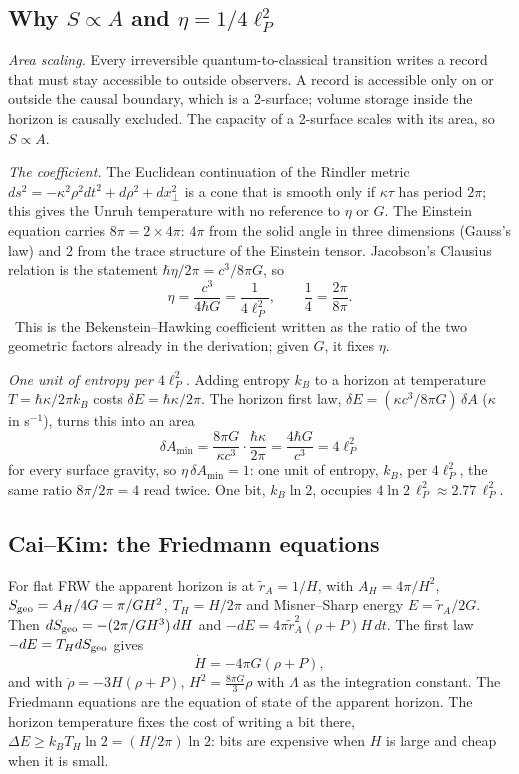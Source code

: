 \subsection{Why $S\propto A$ and $\eta=1/4\ell_P^2$}
\emph{Area scaling.} Every irreversible quantum-to-classical transition writes a record that must stay accessible to outside observers. A record is
accessible only on or outside the causal boundary, which is a 2-surface; volume storage inside the horizon is causally excluded. The capacity of a
2-surface scales with its area, so $S\propto A$.

\emph{The coefficient.} The Euclidean continuation of the Rindler metric $ds^2=-\kappa^2\rho^2dt^2+d\rho^2+dx_\perp^2$ is a cone that is smooth only if
$\kappa\tau$ has period $2\pi$; this gives the Unruh temperature with no reference to $\eta$ or $G$. The Einstein equation carries
$8\pi=2\times4\pi$: $4\pi$ from the solid angle in three dimensions (Gauss's law) and $2$ from the trace structure of the Einstein tensor. Jacobson's
Clausius relation is the statement $\hbar\eta/2\pi=c^3/8\pi G$, so
\begin{equation}\eta=\frac{c^3}{4\hbar G}=\frac{1}{4\ell_P^2},\qquad\frac14=\frac{2\pi}{8\pi}.\end{equation}
\calc\ This is the Bekenstein--Hawking coefficient written as the ratio of the two geometric factors already in the derivation; given $G$, it fixes $\eta$.

\emph{One unit of entropy per $4\ell_P^2$.} Adding entropy $k_B$ to a horizon at temperature $T=\hbar\kappa/2\pi k_B$ costs $\delta E=\hbar\kappa/2\pi$.
The horizon first law, $\delta E=(\kappa c^3/8\pi G)\,\delta A$ ($\kappa$ in s$^{-1}$), turns this into an area
\begin{equation}\delta A_{\min}=\frac{8\pi G}{\kappa c^3}\cdot\frac{\hbar\kappa}{2\pi}=\frac{4\hbar G}{c^3}=4\ell_P^2\end{equation}
for every surface gravity, so $\eta\,\delta A_{\min}=1$: one unit of entropy, $k_B$, per $4\ell_P^2$, the same ratio $8\pi/2\pi=4$ read twice. One bit,
$k_B\ln2$, occupies $4\ln2\,\ell_P^2\approx2.77\,\ell_P^2$.

\subsection{Cai--Kim: the Friedmann equations}
For flat FRW the apparent horizon is at $\tilde r_A=1/H$, with $A_H=4\pi/H^2$, $S_{\rm geo}=A_H/4G=\pi/GH^2$, $T_H=H/2\pi$ and Misner--Sharp energy
$E=\tilde r_A/2G$. Then $dS_{\rm geo}=-(2\pi/GH^3)\,dH$ and $-dE=4\pi\tilde r_A^2(\rho+P)H\,dt$. The first law $-dE=T_HdS_{\rm geo}$ gives
\begin{equation}\dot H=-4\pi G(\rho+P),\end{equation}
and with $\dot\rho=-3H(\rho+P)$, $H^2=\tfrac{8\pi G}{3}\rho$ with $\Lambda$ as the integration constant. The Friedmann equations are the equation of state of
the apparent horizon. The horizon temperature fixes the cost of writing a bit there, $\Delta E\ge k_BT_H\ln2=(H/2\pi)\ln2$: bits are expensive when $H$
is large and cheap when it is small.

